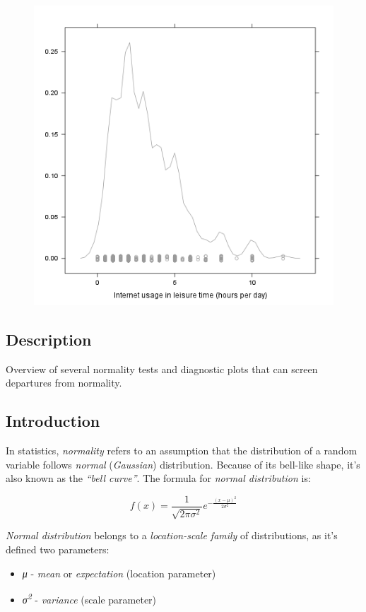 \documentclass[]{article}
\makeatletter
\def\maxwidth{\ifdim\Gin@nat@width>\linewidth\linewidth
\else\Gin@nat@width\fi}
\let\Oldincludegraphics\includegraphics
\renewcommand{\includegraphics}[1]{\Oldincludegraphics[width=\maxwidth]{#1}}
\makeatother
\begin{document}
\begin{figure}[htbp]
\centering
\includegraphics{07657b36ddf71c363ca51d844405b99a.png}
\caption{}
\end{figure}

\subsection{Description}

Overview of several normality tests and diagnostic plots that can screen
departures from normality.

\subsection{Introduction}

In statistics, \emph{normality} refers to an assumption that the
distribution of a random variable follows \emph{normal}
(\emph{Gaussian}) distribution. Because of its bell-like shape, it's
also known as the \emph{``bell curve''}. The formula for \emph{normal
distribution} is:

\[f(x) = \frac{1}{\sqrt{2\pi{}\sigma{}^2}} e^{-\frac{(x-\mu{})^2}{2\sigma{}^2}}\]

\emph{Normal distribution} belongs to a \emph{location-scale family} of
distributions, as it's defined two parameters:

\begin{itemize}
\item
  \emph{μ} - \emph{mean} or \emph{expectation} (location parameter)
\item
  \emph{σ\textsuperscript{2}} - \emph{variance} (scale parameter)
\end{itemize}
\end{document}
